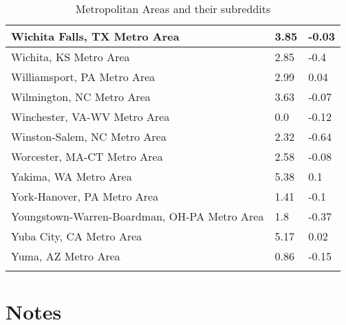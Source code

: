 \documentclass[12pt,oneside, letterpaper]{book}
\begin{document}
\begin{longtable}{| p{} | p{} | p{} |}
    Wichita Falls, TX Metro Area & 3.85 & -0.03 \\ \hline
    Wichita, KS Metro Area & 2.85 & -0.4 \\ \hline
    Williamsport, PA Metro Area & 2.99 & 0.04 \\ \hline
    Wilmington, NC Metro Area & 3.63 & -0.07 \\ \hline
    Winchester, VA-WV Metro Area & 0.0 & -0.12 \\ \hline
    Winston-Salem, NC Metro Area & 2.32 & -0.64 \\ \hline
    Worcester, MA-CT Metro Area & 2.58 & -0.08 \\ \hline
    Yakima, WA Metro Area & 5.38 & 0.1 \\ \hline
    York-Hanover, PA Metro Area & 1.41 & -0.1 \\ \hline
    Youngstown-Warren-Boardman, OH-PA Metro Area & 1.8 & -0.37 \\ \hline
    Yuba City, CA Metro Area & 5.17 & 0.02 \\ \hline
    Yuma, AZ Metro Area & 0.86 & -0.15 \\ \hline
    \caption{Metropolitan Areas and their subreddits}
	\label{table:app-a}
\end{longtable}


\newpage
\chapter*{Notes}

\newpage
{}
\fontsize{10}{10pt} \selectfont

\renewcommand{\bibname}{References}

\printbibliography
\end{document}
